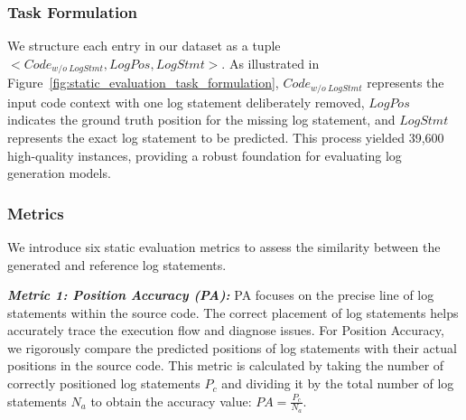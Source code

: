 \subsubsection{Task Formulation}
We structure each entry in our dataset as a tuple \(<Code_{w/o~ LogStmt}, LogPos, LogStmt>\). As illustrated in Figure~\ref{fig:static_evaluation_task_formulation},  \(Code_{w/o~ LogStmt}\) represents the input code context with one log statement deliberately removed, \(LogPos\) indicates the ground truth position for the missing log statement, and \(LogStmt\) represents the exact log statement to be predicted.
 This process yielded 39,600 high-quality instances, providing a robust foundation for evaluating log generation models.

 \subsubsection{Metrics}
 \label{sec:method:metrics}



We introduce six static evaluation metrics to assess the similarity between the generated and reference log statements.

\textit{\textbf{Metric 1: Position Accuracy (PA):}} PA focuses on the precise line of log statements within the source code. The correct placement of log statements helps accurately trace the execution flow and diagnose issues. For Position Accuracy, we rigorously compare the predicted positions of log statements with their actual positions in the source code. This metric is calculated by taking the number of correctly positioned log statements \(P_c\) and dividing it by the total number of log statements \(N_a\) to obtain the accuracy value: \(PA = \frac{P_c}{N_a}\).

